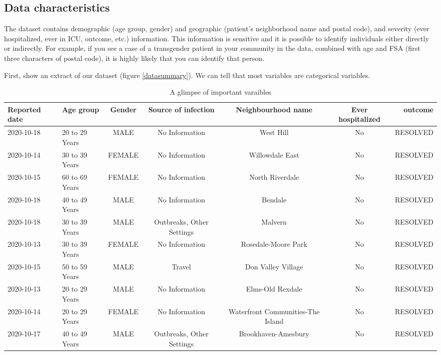 \documentclass[
]{article}
\begin{document}
\hypertarget{data-characteristics}{%
\subsection{Data characteristics}\label{data-characteristics}}

The dataset contains demographic (age group, gender) and geographic (patient's neighborhood name and postal code), and severity (ever hospitalized, ever in ICU, outcome, etc.) information. This information is sensitive and it is possible to identify individuals either directly or indirectly. For example, if you see a case of a transgender patient in your community in the data, combined with age and FSA (first three characters of postal code), it is highly likely that you can identify that person.

First, show an extract of our dataset (figure \ref{datasummary}). We can tell that most variables are categorical variables.

\begin{table}

\caption{\label{tab:datasummary}A glimpse of important varaibles}
\centering
\begin{tabular}[t]{llccccr}
\toprule
Reported date & Age group & Gender & Source of infection & Neighbourhood name & Ever hospitalized & outcome\\
\midrule
2020-10-18 & 20 to 29 Years & MALE & No Information & West Hill & No & RESOLVED\\
2020-10-14 & 30 to 39 Years & FEMALE & No Information & Willowdale East & No & RESOLVED\\
2020-10-15 & 60 to 69 Years & FEMALE & No Information & North Riverdale & No & RESOLVED\\
2020-10-18 & 40 to 49 Years & MALE & No Information & Bendale & No & RESOLVED\\
2020-10-18 & 30 to 39 Years & MALE & Outbreaks, Other Settings & Malvern & No & RESOLVED\\
2020-10-13 & 30 to 39 Years & FEMALE & No Information & Rosedale-Moore Park & No & RESOLVED\\
2020-10-15 & 50 to 59 Years & MALE & Travel & Don Valley Village & No & RESOLVED\\
2020-10-13 & 20 to 29 Years & MALE & No Information & Elms-Old Rexdale & No & RESOLVED\\
2020-10-14 & 20 to 29 Years & FEMALE & No Information & Waterfront Communities-The Island & No & RESOLVED\\
2020-10-17 & 40 to 49 Years & MALE & Outbreaks, Other Settings & Brookhaven-Amesbury & No & RESOLVED\\
\bottomrule
\end{tabular}
\end{table}
\end{document}
